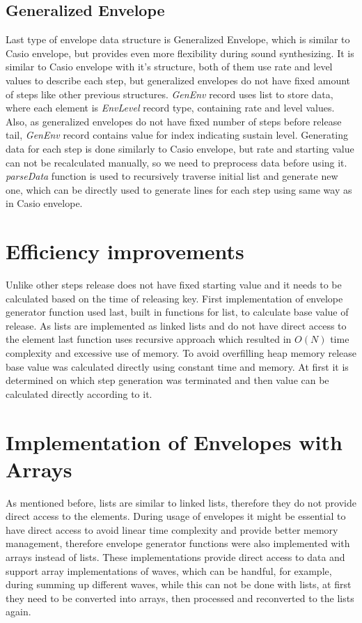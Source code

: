 \documentclass[12pt, a4paper]{article}
\begin{document}
\subsection{Generalized Envelope}

Last type of envelope data structure is Generalized Envelope, which is similar to Casio envelope, but provides even more flexibility during sound synthesizing. It is similar to Casio envelope with it’s structure, both of them use rate and level values to describe each step, but generalized envelopes do not have fixed amount of steps like other previous structures. \textit{GenEnv} record uses list to store data, where each element is \textit{EnvLevel} record type, containing rate and level values. Also, as generalized envelopes do not have fixed number of steps before release tail, \textit{GenEnv} record contains value for index indicating sustain level. Generating data for each step is done similarly to Casio envelope, but rate and starting value can not be recalculated manually, so we need to preprocess data before using it. \textit{parseData} function is used to recursively traverse initial list and generate new one, which can be directly used to generate lines for each step using same way as in Casio envelope. 

\section{Efficiency improvements}

Unlike other steps release does not have fixed starting value and it needs to be calculated based on the time of releasing key. First implementation of envelope generator function used last, built in functions for list, to calculate base value of release. As lists are implemented as linked lists and do not have direct access to the element last function uses recursive approach which resulted in \(O(N)\) time complexity and excessive use of memory. To avoid overfilling heap memory release base value was calculated directly using constant time and memory. At first it is determined on which step generation was terminated and then value can be calculated directly according to it. 

\section{Implementation of Envelopes with Arrays}

As mentioned before, lists are similar to linked lists, therefore they do not provide direct access to the elements. During usage of envelopes it might be essential to have direct access to avoid linear time complexity and provide better memory management, therefore envelope generator functions were also implemented with arrays instead of lists. These implementations provide direct access to data and support array implementations of waves, which can be handful, for example, during summing up different waves, while this can not be done with lists, at first they need to be converted into arrays, then processed and reconverted to the lists again.
\end{document}
